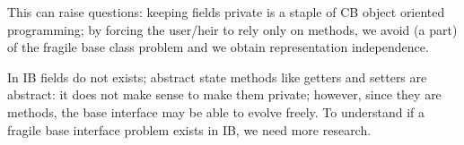 This can raise questions: keeping fields private is a staple of CB object oriented programming;
by forcing the user/heir to rely only on methods, we avoid (a part)
of the fragile base class problem and we obtain representation independence.

In IB fields do not exists; abstract state methods like getters and setters are abstract:
it does not make sense to make them private; however, since they are methods,
the base interface may be able to evolve freely. 
To understand if a fragile base interface problem exists in IB, we need more research.



%
%
%
%
%
%



